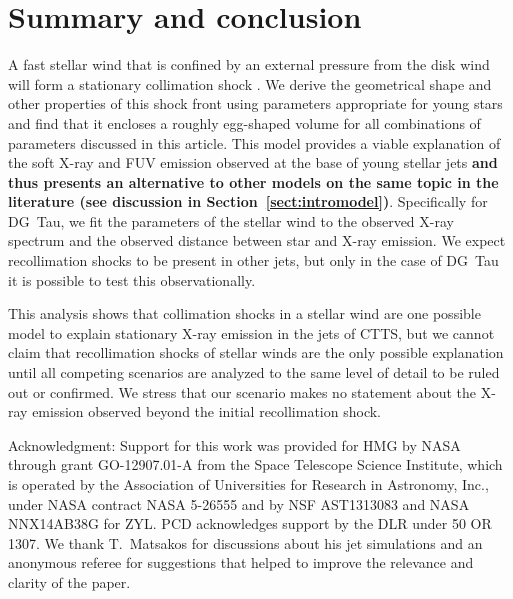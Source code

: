 \section{Summary and conclusion}
\label{sect:summary}
A fast stellar wind that is confined by an external pressure from the disk wind will form a stationary collimation shock \citep{2012MNRAS.422.2282K}. We derive the geometrical shape and other properties of this shock front using parameters appropriate for young stars and find that it encloses a roughly egg-shaped volume for all combinations of parameters discussed in this article. This model provides a viable explanation of the soft X-ray and FUV emission observed at the base of young stellar jets \textbf{and thus presents an alternative to other models on the same topic in the literature (see discussion in Section~\ref{sect:intromodel})}. Specifically for DG~Tau, we fit the parameters of the stellar wind to the observed X-ray spectrum and the observed distance between star and X-ray emission.  We expect recollimation shocks to be present in other jets, but only in the case of DG~Tau it is possible to test this observationally.

This analysis shows that collimation shocks in a stellar wind are one possible model to explain stationary X-ray emission in the jets of CTTS, but we cannot claim that recollimation shocks of stellar winds are the only possible explanation until all competing scenarios are analyzed to the same level of detail to be ruled out or confirmed. We stress that our scenario makes no statement about the X-ray emission observed beyond the initial recollimation shock.




Acknowledgment: 
Support for this work was provided for HMG by NASA through grant GO-12907.01-A from the Space Telescope Science Institute, which is operated by the Association of Universities for Research in Astronomy, Inc., under NASA contract NASA 5-26555 and by NSF AST1313083 and NASA NNX14AB38G for ZYL. PCD acknowledges support by the DLR under 50 OR 1307. We thank T.~Matsakos for discussions about his jet simulations and an anonymous referee for suggestions that helped to improve the relevance and clarity of the paper.